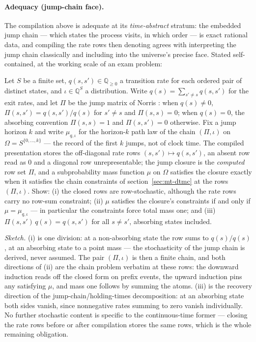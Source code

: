\paragraph{Adequacy (jump-chain face).} The compilation above is
adequate at its \emph{time-abstract} stratum: the embedded jump chain
--- which states the process visits, in which order --- is exact
rational data, and compiling the rate rows then denoting agrees with
interpreting the jump chain classically and including into the
universe's precise face.  Stated self-contained, at the working scale
of an exam problem:

\begin{problem}
\label{prob:mt-ctmc}
Let $S$ be a finite set, $q(s, s') \in
\mathbb{Q}_{\ge 0}$ a transition rate for each ordered pair of
distinct states, and $\iota \in \mathbb{Q}^S$ a distribution.  Write
$q(s) = \sum_{s' \neq s} q(s, s')$ for the exit rates, and let $\Pi$
be the jump matrix of Norris \cite{norris-1997}: when $q(s) \neq 0$,
$\Pi(s, s') = q(s, s')/q(s)$ for $s' \neq s$ and $\Pi(s, s) = 0$;
when $q(s) = 0$, the absorbing convention $\Pi(s, s) = 1$ and
$\Pi(s, s') = 0$ otherwise.  Fix a jump horizon $k$ and write
$\mu_{q,\iota}$ for the horizon-$k$ path law of the chain $(\Pi,
\iota)$ on $\Omega = S^{\{0,\dots,k\}}$ --- the record of the first
$k$ jumps, not of clock time.  The compiled presentation stores the
off-diagonal rate rows $(s, s') \mapsto q(s, s')$, an absent row read
as $0$ and a diagonal row unrepresentable; the jump closure is the
\emph{computed} row set $\Pi$, and a subprobability mass function
$\mu$ on $\Omega$ satisfies the closure exactly when it satisfies the
chain constraints of section~\ref{sec:mt-dtmc} at the rows $(\Pi,
\iota)$.  Show: (i) the closed rows are row-stochastic, although the
rate rows carry no row-sum constraint; (ii) $\mu$ satisfies the
closure's constraints if and only if $\mu = \mu_{q,\iota}$ --- in
particular the constraints force total mass one; and (iii)
$\Pi(s, s')\, q(s) = q(s, s')$ for all $s \neq s'$, absorbing states
included.
\end{problem}

\emph{Sketch.}  (i) is one division: at a non-absorbing state the row
sums to $q(s)/q(s)$, at an absorbing state to a point mass --- the
stochasticity of the jump chain is derived, never assumed.  The pair
$(\Pi, \iota)$ is then a finite chain, and both directions of (ii) are
the chain problem verbatim at these rows: the downward induction reads
off the closed form on prefix events, the upward induction pins any
satisfying $\mu$, and mass one follows by summing the atoms.  (iii) is
the recovery direction of the jump-chain/holding-times decomposition:
at an absorbing state both sides vanish, since nonnegative rates
summing to zero vanish individually.  No further stochastic content is
specific to the continuous-time former --- closing the rate rows
before or after compilation stores the same rows, which is the whole
remaining obligation.

